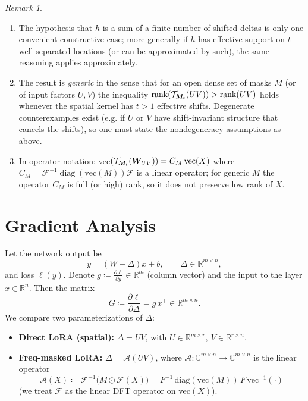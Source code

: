 \documentclass{article}
\theoremstyle{plain}
\theoremstyle{definition}
\theoremstyle{remark}
\newtheorem{remark}[theorem]{Remark}
\begin{document}
\begin{remark}
\begin{enumerate}
\item The hypothesis that $h$ is a sum of a finite number of shifted deltas is only one convenient constructive case; more generally if $h$ has effective support on $t$ well-separated locations (or can be approximated by such), the same reasoning applies approximately.
\item The result is \emph{generic} in the sense that for an open dense set of masks $M$ (or of input factors $U,V$) the inequality $\operatorname{rank}(\mathcal{T}_{{\bm{M}}_t}(UV))>\operatorname{rank}(UV)$ holds whenever the spatial kernel has $t>1$ effective shifts. Degenerate counterexamples exist (e.g. if $U$ or $V$ have shift-invariant structure that cancels the shifts), so one must state the nondegeneracy assumptions as above.
\item In operator notation: vec$(\mathcal{T}_{{\bm{M}}_t}({\bm{W}}_{UV})) = C_M\,\mathrm{vec}(X)$ where $C_M=\mathcal{F}^{-1}\operatorname{diag}(\mathrm{vec}(M))\mathcal{F}$ is a linear operator; for generic $M$ the operator $C_M$ is full (or high) rank, so it does not preserve low rank of $X$.
\end{enumerate}
\end{remark}

\section{Gradient Analysis}

Let the network output be
\[
y = (W + \Delta) x + b,
\qquad
\Delta \in\mathbb{R}^{m\times n},
\]
and loss \(\ell(y)\). Denote \(g \coloneqq \frac{\partial \ell}{\partial y}\in\mathbb{R}^{m}\) (column vector) and the input to the layer \(x\in\mathbb{R}^{n}\). Then the matrix
\[
G \coloneqq \frac{\partial \ell}{\partial \Delta} = g\,x^\top \in\mathbb{R}^{m\times n}.
\]
We compare two parameterizations of \(\Delta\):

\begin{itemize}
  \item \textbf{Direct LoRA (spatial):} \(\Delta = UV\), with \(U\in\mathbb{R}^{m\times r},\ V\in\mathbb{R}^{r\times n}\).
  \item \textbf{Freq-masked LoRA:} \(\Delta = \mathcal{A}(UV)\), where \(\mathcal{A}:\mathbb{C}^{m\times n}\to\mathbb{C}^{m\times n}\) is the linear operator
  \[
  \mathcal{A}(X) \coloneqq \mathcal{F}^{-1}\big( M \odot \mathcal{F}(X)\big)
  = F^{-1}\,\mathrm{diag}(\mathrm{vec}(M))\,F\,\mathrm{vec}^{-1}(\cdot)
  \]
  (we treat \(\mathcal{F}\) as the linear DFT operator on \(\mathrm{vec}(X)\)).
\end{itemize}
\end{document}
